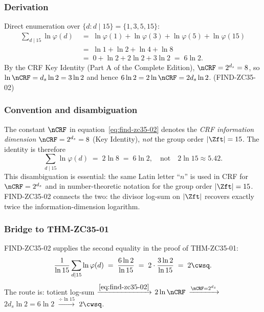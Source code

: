 \documentclass[12pt, a4paper]{article}
\begin{document}
\subsubsection{Derivation}

\begin{derivedbox}[title={FIND-ZC35-02: Derivation}]
Direct enumeration over $\{d : d \mid 15\} = \{1,3,5,15\}$:
\[
\begin{aligned}
  \sum_{d \mid 15} \ln \varphi(d)
  &\;=\; \ln \varphi(1) + \ln \varphi(3) + \ln \varphi(5) + \ln \varphi(15)\\
  &\;=\; \ln 1 + \ln 2 + \ln 4 + \ln 8\\
  &\;=\; 0 + \ln 2 + 2\ln 2 + 3 \ln 2 \;=\; 6 \ln 2.
\end{aligned}
\]
By the CRF Key Identity (Part A of the Complete Edition),
$\nCRF = 2^{d_s} = 8$, so $\ln \nCRF = d_s \ln 2 = 3 \ln 2$ and hence
$6 \ln 2 = 2 \ln \nCRF = 2 d_s \ln 2$.
\hfill\textup{(FIND-ZC35-02)}
\end{derivedbox}

\subsubsection{Convention and disambiguation}

\begin{keybox}[title={Disambiguation: $\nCRF$ vs.\ $|\Zft|$}]
The constant $\nCRF$ in equation~\eqref{eq:find-zc35-02} denotes the
\emph{CRF information dimension} $\nCRF = 2^{d_s} = 8$ (Key Identity),
\emph{not} the group order $|\Zft| = 15$. The identity is therefore
\[
  \sum_{d \mid 15} \ln \varphi(d) \;=\; 2 \ln 8 \;=\; 6 \ln 2,
  \quad\text{not}\quad 2 \ln 15 \approx 5.42.
\]
This disambiguation is essential: the same Latin letter ``$n$'' is used
in CRF for $\nCRF = 2^{d_s}$ and in number-theoretic notation for the
group order $|\Zft| = 15$. FIND-ZC35-02 connects the two: the divisor
log-sum on $|\Zft|$ recovers exactly twice the information-dimension
logarithm.
\end{keybox}

\subsubsection{Bridge to THM-ZC35-01}

FIND-ZC35-02 supplies the second equality in the proof of THM-ZC35-01:
\[
  \frac{1}{\ln 15} \sum_{d \mid 15} \ln \varphi(d)
  \;=\; \frac{6 \ln 2}{\ln 15}
  \;=\; 2 \cdot \frac{3 \ln 2}{\ln 15}
  \;=\; 2 \cwsq.
\]
The route is: totient log-sum $\xrightarrow{\eqref{eq:find-zc35-02}}$
$2\ln\nCRF$ $\xrightarrow{\nCRF=2^{d_s}}$ $2 d_s \ln 2 = 6 \ln 2$
$\xrightarrow{\text{÷}\ln 15}$ $2\cwsq$.
\end{document}
